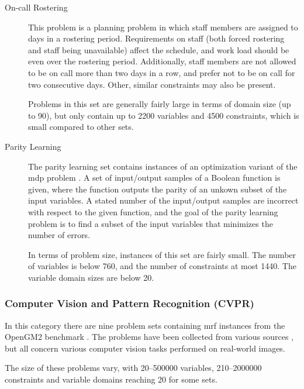 \begin{description}
	\item[On-call Rostering]
		This problem is a planning problem in which staff members are assigned to days in a rostering period.
		Requirements on staff (both forced rostering and staff being unavailable) affect the schedule, and work load should be even over the rostering period.
		Additionally, staff members are not allowed to be on call more than two days in a row, and prefer not to be on call for two consecutive days.
		Other, similar constraints may also be present.

		Problems in this set are generally fairly large in terms of domain size (up to \num{90}), but only contain up to \num{2200} variables and \num{4500} constraints, which is small compared to other sets.
	
	\item[Parity Learning]
		The parity learning set contains instances of an optimization variant of the \gls{mdp} problem \parencite{Crawford94}.
		A set of input/output samples of a Boolean function is given, where the function outputs the parity of an unkown subset of the input variables.
		A stated number of the input/output samples are incorrect with respect to the given function, and the goal of the parity learning problem is to find a subset of the input variables that minimizes the number of errors.

		In terms of problem size, instances of this set are fairly small. The number of variables is below \num{760}, and the number of constraints at most \num{1440}. The variable domain sizes are below \num{20}.
\end{description}

\subsubsection{Computer Vision and Pattern Recognition (CVPR)}
In this category there are nine problem sets containing \gls{mrf} instances from the OpenGM2 benchmark \parencite{Kappes13}.
The problems have been collected from various sources \parencite[\pno~1330]{Kappes13}, but all concern various computer vision tasks performed on real-world images.

The size of these problems vary, with \numrange{20}{500000} variables, \numrange{210}{2000000} constraints and variable domains reaching \num{20} for some sets.

